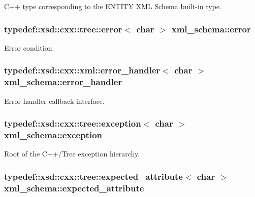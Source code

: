 C++ type corresponding to the E\-N\-T\-I\-T\-Y X\-M\-L Schema built-\/in type. 

\hypertarget{namespacexml__schema_a25204746dcf5a00a92e68d214a894b84}{
\subsubsection[{error}]{\setlength{\rightskip}{0pt plus 5cm}typedef\-::xsd\-::cxx\-::tree\-::error$<$ char $>$ {\bf xml\-\_\-schema\-::error}}}\label{namespacexml__schema_a25204746dcf5a00a92e68d214a894b84}


Error condition. 

\hypertarget{namespacexml__schema_a0a5d9528e9175cedf199984a8bb64d62}{
\subsubsection[{error\-\_\-handler}]{\setlength{\rightskip}{0pt plus 5cm}typedef\-::xsd\-::cxx\-::xml\-::error\-\_\-handler$<$ char $>$ {\bf xml\-\_\-schema\-::error\-\_\-handler}}}\label{namespacexml__schema_a0a5d9528e9175cedf199984a8bb64d62}


Error handler callback interface. 

\hypertarget{namespacexml__schema_a1e9265f27587f794fe1b02f5cefb447f}{
\subsubsection[{exception}]{\setlength{\rightskip}{0pt plus 5cm}typedef\-::xsd\-::cxx\-::tree\-::exception$<$ char $>$ {\bf xml\-\_\-schema\-::exception}}}\label{namespacexml__schema_a1e9265f27587f794fe1b02f5cefb447f}


Root of the C++/\-Tree exception hierarchy. 

\hypertarget{namespacexml__schema_af16d098ecb2b5ba96a0734aa34bd8a5b}{
\subsubsection[{expected\-\_\-attribute}]{\setlength{\rightskip}{0pt plus 5cm}typedef\-::xsd\-::cxx\-::tree\-::expected\-\_\-attribute$<$ char $>$ {\bf xml\-\_\-schema\-::expected\-\_\-attribute}}}\label{namespacexml__schema_af16d098ecb2b5ba96a0734aa34bd8a5b}


